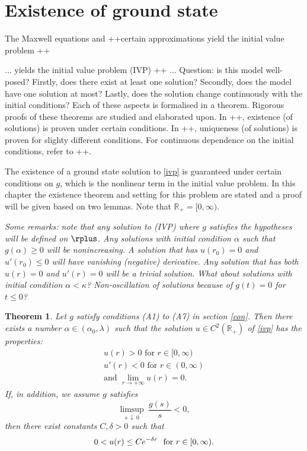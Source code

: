 \newtheorem{thmx}{Theorem}
\renewcommand{\thethmx}{\Alph{thmx}}
\section{Existence of ground state}
The Maxwell equations and ++certain approximations yield the initial value problem ++

... yields the initial value problem (IVP) ++ ... Question: is this model well-posed? Firstly, does there exist at least one solution? Secondly, does the model have one solution at most? Lastly, does the solution change continuously with the initial conditions? Each of these aspects is formalised in a theorem. Rigorous proofs of these theorems are studied and elaborated upon. In ++, existence (of solutions) is proven under certain conditions. In ++, uniqueness (of solutions) is proven for slighty different conditions. For continuous dependence on the initial conditions, refer to ++.

The existence of a ground state solution to \eqref{ivp} is guaranteed under certain conditions on $g$, which is the nonlinear term in the initial value problem. In this chapter the existence theorem and setting for this problem are stated and a proof will be given based on two lemmas. Note that $\mathbb{R}_+=[0,\infty)$.

\emph{Some remarks: note that any solution to (IVP) where $g$ satisfies the hypotheses will be defined on $\rplus$. Any solutions with initial condition $\alpha$ such that $g(\alpha) \geq 0$ will be nonincreasing. A solution that has $u(r_0)=0$ and $u'(r_0)\leq0$ will have vanishing (negative) derivative. Any solution that has both $u(r)=0$ and $u'(r)=0$ will be a trivial solution. What about solutions with initial condition $\alpha<\kappa$? Non-oscillation of solutions because of $g(t)=0$ for $t\leq0$?}

\begin{thmx}\label{exithm}
Let $g$ satisfy conditions (A1) to (A7) in section \ref{con}. Then there exists a number $\alpha\in(\alpha_0,\lambda)$ such that the solution $u\in C^2(\mathbb{R}_+)$ of \eqref{ivp} has the properties: \begin{gather*}u(r)>0\text{ for }r\in[0,\infty)\\u'(r)<0\text{ for }r\in(0,\infty)\\ \text{and }\lim_{r\to+\infty}u(r)=0.\end{gather*} If, in addition, we assume $g$ satisfies $$\limsup_{s~\downarrow~0}~\frac{g(s)}{s}<0,$$ then there exist constants $C,\delta>0$ such that $$0<u(r)\leq Ce^{-\delta r} ~~ \textnormal{for} ~ r\in[0,\infty).$$
\end{thmx}


